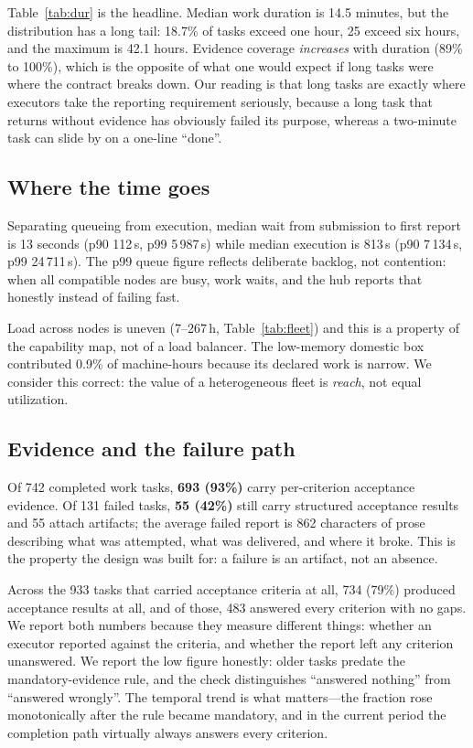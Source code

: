 \documentclass{article}
\begin{document}
Table~\ref{tab:dur} is the headline. Median work duration is 14.5 minutes, but the
distribution has a long tail: 18.7\% of tasks exceed one hour, 25 exceed six hours,
and the maximum is 42.1 hours. Evidence coverage \emph{increases} with duration
(89\% to 100\%), which is the opposite of what one would expect if long tasks were
where the contract breaks down. Our reading is that long tasks are exactly where
executors take the reporting requirement seriously, because a long task that returns
without evidence has obviously failed its purpose, whereas a two-minute task can
slide by on a one-line ``done''.

\subsection{Where the time goes}

Separating queueing from execution, median wait from submission to first report is
13 seconds (p90 112\,s, p99 5\,987\,s) while median execution is 813\,s
(p90 7\,134\,s, p99 24\,711\,s). The p99 queue figure reflects deliberate backlog, not
contention: when all compatible nodes are busy, work waits, and the hub reports that
honestly instead of failing fast.

Load across nodes is uneven (7--267\,h, Table~\ref{tab:fleet}) and this is a
property of the capability map, not of a load balancer. The low-memory domestic box
contributed 0.9\% of machine-hours because its declared work is narrow. We consider
this correct: the value of a heterogeneous fleet is \emph{reach}, not equal
utilization.

\subsection{Evidence and the failure path}

Of 742 completed work tasks, \textbf{693 (93\%)} carry per-criterion acceptance
evidence. Of 131 failed tasks, \textbf{55 (42\%)} still carry structured acceptance
results and 55 attach artifacts; the average failed report is 862 characters of
prose describing what was attempted, what was delivered, and where it broke. This is
the property the design was built for: a failure is an artifact, not an absence.

Across the 933 tasks that carried acceptance criteria at all, 734 (79\%) produced
acceptance results at all, and of those, 483 answered every criterion with no gaps.
We report both numbers because they measure different things: whether an executor
reported against the criteria, and whether the report left any criterion unanswered. We report the low
figure honestly: older tasks predate the mandatory-evidence rule, and the check
distinguishes ``answered nothing'' from ``answered wrongly''. The temporal trend is
what matters---the fraction rose monotonically after the rule became mandatory, and
in the current period the completion path virtually always answers every criterion.
\end{document}
